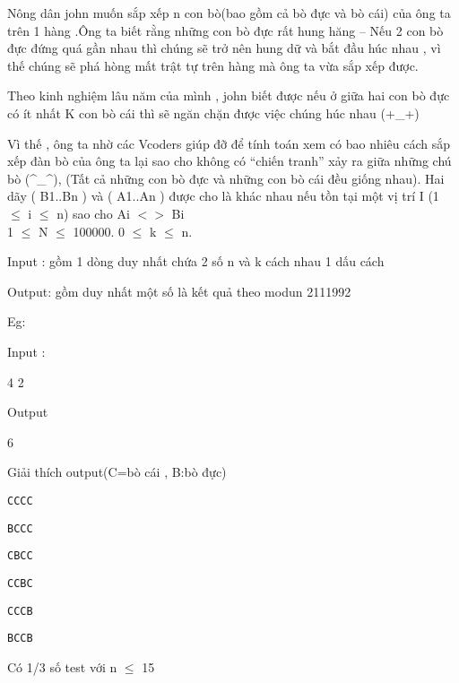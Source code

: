 



   Nông dân john muốn sắp xếp n con bò(bao gồm cả bò đực và bò cái) của ông ta trên 1 hàng .Ông ta biết rằng những con bò đực rất hung hăng – Nếu 2 con bò đực đứng quá gần nhau thì chúng sẽ trở nên hung dữ và bắt đầu húc nhau , vì thế chúng sẽ phá hòng mất trật tự trên hàng mà ông ta vừa sắp xếp được.  

   Theo kinh nghiệm lâu năm của mình , john biết được nếu ở giữa hai con bò đực có ít nhất K con bò cái thì sẽ ngăn chặn được việc chúng húc nhau (+\_+)  

   Vì thế , ông ta nhờ các Vcoders giúp đỡ để tính toán xem có bao nhiêu cách sắp xếp đàn bò của ông ta lại sao cho không có “chiến tranh” xảy ra giữa những chú bò (^\_^), (Tất cả những con bò đực và những con bò cái đều giống nhau). Hai dãy (       B1..Bn       ) và (       A1..An       ) được cho là khác nhau nếu tồn tại một vị trí I (1 $\le$ i $\le$ n) sao cho       Ai $<$$>$ Bi    
\\

   1 $\le$ N $\le$ 100000. 0 $\le$ k $\le$ n.  

   Input : gồm 1 dòng duy nhất chứa 2 số n và k cách nhau 1 dấu cách  

   Output: gồm duy nhất một số là kết quả theo modun 2111992  



   Eg:  

   Input :  



   4 2  



   Output  



   6  



   Giải thích output(C=bò cái , B:bò đực)  
\begin{verbatim}
CCCC\end{verbatim}
\begin{verbatim}
BCCC\end{verbatim}
\begin{verbatim}
CBCC\end{verbatim}
\begin{verbatim}
CCBC\end{verbatim}
\begin{verbatim}
CCCB\end{verbatim}
\begin{verbatim}
BCCB\end{verbatim}

Có 1/3 số test với n $\le$ 15
